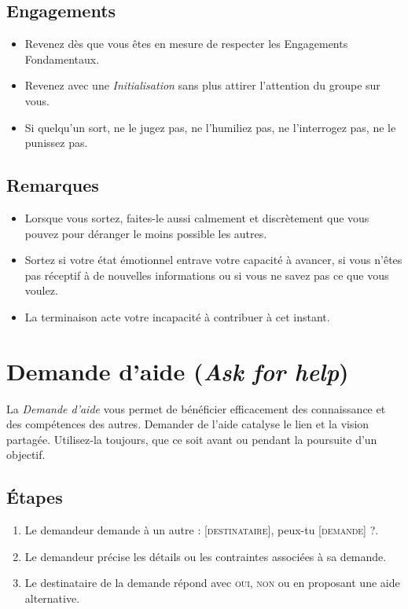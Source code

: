 \documentclass[11pt]{book}
\let\oldsection\section
\renewcommand\section{\clearpage\oldsection}
\begin{document}
\subsection{Engagements}
\begin{itemize}
	\item Revenez dès que vous êtes en mesure de respecter les Engagements Fondamentaux.
	\item Revenez avec une \emph{Initialisation} sans plus attirer l'attention du groupe sur vous.
	\item Si quelqu'un sort, ne le jugez pas, ne l'humiliez pas, ne l'interrogez pas, ne le punissez pas.
\end{itemize}

\subsection{Remarques}
\begin{itemize}
	\item Lorsque vous sortez, faites-le aussi calmement et discrètement que vous pouvez pour déranger le moins possible les autres.
	\item Sortez si votre état émotionnel entrave votre capacité à avancer, si vous n'êtes pas réceptif à de nouvelles informations ou
	      si vous ne savez pas ce que vous voulez.
	\item La terminaison acte votre incapacité à contribuer à cet instant.
\end{itemize}

\section{Demande d'aide (\emph{Ask for help})} \label{demande-aide}

La \emph{Demande d'aide} vous permet de bénéficier efficacement des connaissance et des compétences des autres. Demander de l'aide
catalyse le lien et la vision partagée. Utilisez-la toujours, que ce soit avant ou pendant la poursuite d'un objectif.

\subsection{Étapes}
\begin{enumerate}
	\item Le demandeur demande à un autre : \og{}[\textsc{destinataire}], peux-tu [\textsc{demande}] ?\fg{}.
	\item Le demandeur précise les détails ou les contraintes associées à sa demande.
	\item Le destinataire de la demande répond avec \textsc{oui}, \textsc{non} ou en proposant une aide alternative.
\end{enumerate}
\end{document}
